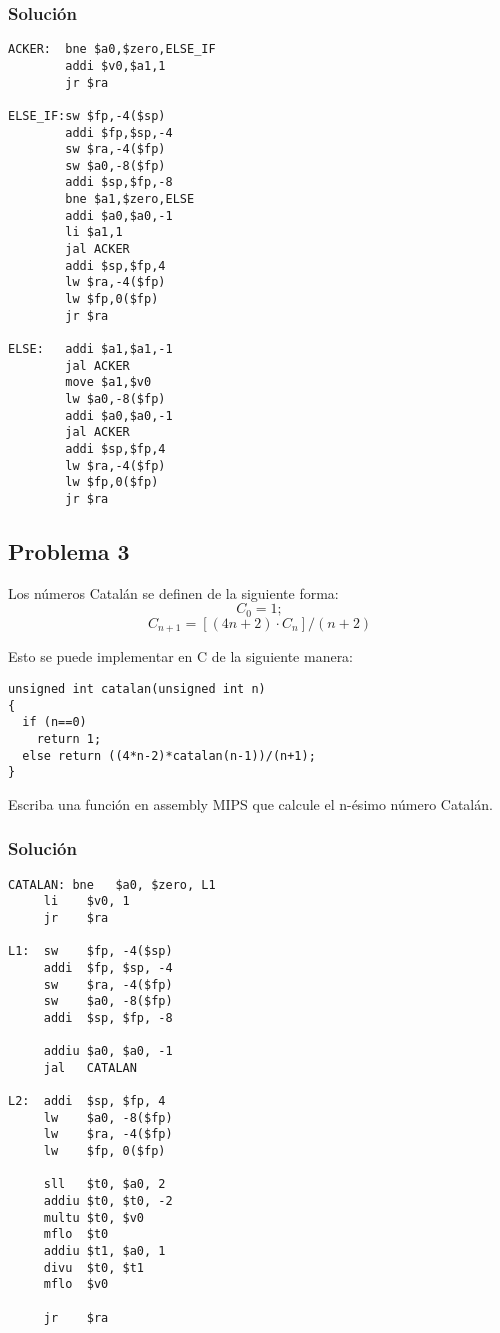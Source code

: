 \documentclass[letterpaper,11pt,notitlepage]{article}
\begin{document}
\subsubsection*{Solución}
\begin{lstlisting}[style=C]
ACKER:  bne $a0,$zero,ELSE_IF
        addi $v0,$a1,1
        jr $ra
        
ELSE_IF:sw $fp,-4($sp)
        addi $fp,$sp,-4 
        sw $ra,-4($fp) 
        sw $a0,-8($fp) 
        addi $sp,$fp,-8      
        bne $a1,$zero,ELSE 
        addi $a0,$a0,-1 
        li $a1,1 
        jal ACKER        
        addi $sp,$fp,4 
        lw $ra,-4($fp) 
        lw $fp,0($fp)
        jr $ra 
        
ELSE:   addi $a1,$a1,-1
        jal ACKER      
        move $a1,$v0 
        lw $a0,-8($fp) 
        addi $a0,$a0,-1 
        jal ACKER           
        addi $sp,$fp,4    
        lw $ra,-4($fp)
        lw $fp,0($fp)  
        jr $ra  
\end{lstlisting}%
\newpage

\subsection*{Problema 3}

Los números Catalán se definen de la siguiente forma:
\begin{equation}
C_{0} = 1;
\end{equation}
\begin{equation}
C_{n+1} = [(4n+2)\cdot C_{n}]/(n+2)
\end{equation}

Esto se puede implementar en C de la siguiente manera:

\begin{lstlisting}[style=C]
unsigned int catalan(unsigned int n)
{
  if (n==0)
    return 1;
  else return ((4*n-2)*catalan(n-1))/(n+1);
} 
\end{lstlisting}


Escriba una función en assembly MIPS que calcule el n-ésimo número Catalán.

\subsubsection*{Solución}
\begin{lstlisting}[style=C]
CATALAN: bne   $a0, $zero, L1
	 li    $v0, 1
	 jr    $ra

L1:	 sw    $fp, -4($sp)
	 addi  $fp, $sp, -4
	 sw    $ra, -4($fp)
	 sw    $a0, -8($fp)
	 addi  $sp, $fp, -8

	 addiu $a0, $a0, -1
	 jal   CATALAN

L2:	 addi  $sp, $fp, 4
	 lw    $a0, -8($fp)
	 lw    $ra, -4($fp)
	 lw    $fp, 0($fp)

	 sll   $t0, $a0, 2
	 addiu $t0, $t0, -2
	 multu $t0, $v0
	 mflo  $t0
	 addiu $t1, $a0, 1
	 divu  $t0, $t1
	 mflo  $v0

	 jr    $ra
\end{lstlisting}
\end{document}
